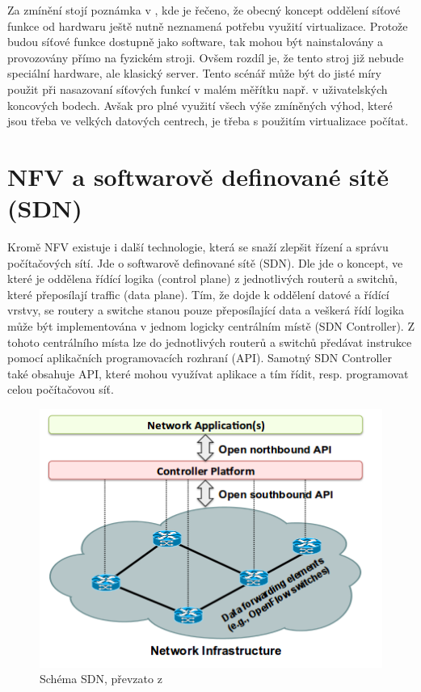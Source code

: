 Za zmínění stojí poznámka v \cite{NFVState}, kde je řečeno, že obecný koncept oddělení síťové funkce od hardwaru ještě nutně neznamená potřebu využití virtualizace. Protože budou síťové funkce dostupně jako software, tak mohou být nainstalovány a provozovány přímo na fyzickém stroji. Ovšem rozdíl je, že tento stroj již nebude speciální hardware, ale klasický server. Tento scénář může být do jisté míry použit při nasazovaní síťových funkcí v malém měřítku např. v uživatelských koncových bodech. Avšak pro plné využití všech výše zmíněných výhod, které jsou třeba ve velkých datových centrech, je třeba s použitím virtualizace počítat.

\section{NFV a softwarově definované sítě (SDN)}

Kromě NFV existuje i další technologie, která se snaží zlepšit řízení a správu počítačových sítí. Jde o softwarově definované sítě (SDN). Dle \cite{SDN_clanek} jde o koncept, ve které je oddělena řídící logika (control plane) z jednotlivých routerů a switchů, které přeposílají traffic (data plane). Tím, že dojde k oddělení datové a řídící vrstvy, se routery a switche stanou pouze přeposílající data a veškerá řídí logika může být implementována v jednom logicky centrálním místě (SDN Controller). Z tohoto centrálního místa lze do jednotlivých routerů a switchů předávat instrukce pomocí aplikačních programovacích rozhraní (API). Samotný SDN Controller také obsahuje API, které mohou využívat aplikace a tím řídit, resp. programovat celou počítačovou síť.

\begin{figure}[h]
\begin{centering}
\includegraphics[scale=0.70]{images/SDN}
\par\end{centering}
\caption{Schéma SDN, převzato z \cite{SDN_clanek}\label{fig:SDN}}
\end{figure}

